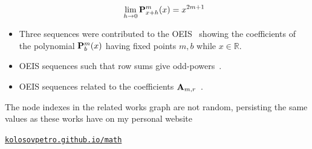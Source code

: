 \begin{itemize}
    \begin{align*}
        \lim_{h \to 0} {\mathbf{P}}\sp{m} \sb{x+h}(x) = x^{2m+1}
    \end{align*}
    \item Three sequences were contributed to the
    OEIS~\cite{kolosov2018coefficientspolynomial1, kolosov2018coefficientspolynomial2, kolosov2018coefficientspolynomial3}
    showing the coefficients of the polynomial ${\mathbf{P}}\sp{m} \sb{b}(x)$ having fixed points $m,b$ while $x\in\mathbb{R}$.
    \item OEIS sequences such that row sums give odd-powers~\cite{kolosov2017third, kolosov2018fifth, kolosov2018seventh}.
    \item OEIS sequences related to the coefficients ${\mathbf{A}} \sb{m,r}$~\cite{kolosov2018numerator, kolosov2018denominator}.
\end{itemize}
The node indexes in the related works graph are not random, persisting the same values as
these works have on my personal website
\begin{center}
    \href{https://kolosovpetro.github.io/math/}{\texttt{kolosovpetro.github.io/math}}
\end{center}
